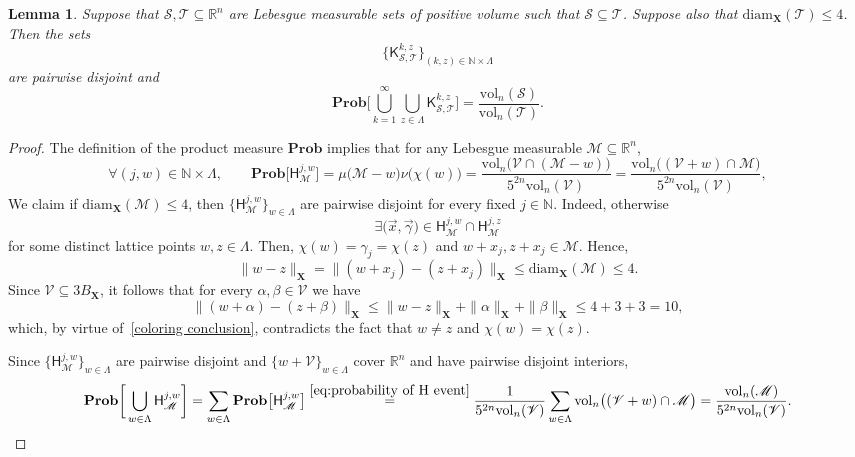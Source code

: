 \documentclass[11pt,reqno]{amsart}
\renewcommand{\le}{\leqslant}
\newcommand{\diam}{\mathrm{diam}}
\newcommand{\X}{\mathbf X}
\newcommand{\R}{\mathbb R}
\newtheorem{lemma}[theorem]{Lemma}
\theoremstyle{remark}
\renewcommand{\subset}{\subseteq}
\newcommand{\N}{\mathbb N}
\renewcommand{\Pr}{\mathbf{Prob}}
\newcommand{\vol}{\mathrm{vol}}
\renewcommand{\1}{\mathbf 1}
\newcommand{\DD}{\mathscr{V}}
\begin{document}
\begin{lemma}\label{lem:volume ratio}
Suppose that $\mathscr{S},\mathscr{T}\subset \R^n$ are Lebesgue measurable sets of positive volume such that $\mathscr{S}\subset   \mathscr{T}$. Suppose also that $\diam_{\X}(\mathscr{T})\le 4$. Then the sets $$\big\{\mathsf{K}_{\mathscr{S,T}}^{k,z}\big\}_{(k,z)\in \N\times \Lambda}$$ are pairwise disjoint and
\begin{equation}\label{eq:hitting set prob}
\Pr\bigg[\bigcup_{k=1}^\infty\bigcup_{z\in \Lambda}\mathsf{K}_{\mathscr{S,T}}^{k,z}\bigg]=\frac{\vol_n(\mathscr{S})}{\vol_n(\mathscr{T})}.
\end{equation}
\end{lemma}


\begin{proof} The definition of the product measure $\Pr$ implies that for any Lebesgue measurable $\mathscr{M}\subset \R^n$,
\begin{equation}\label{eq:probability of H event}
\forall (j,w)\in \N\times \Lambda,\qquad \Pr\big[\mathsf{H}_{\mathscr{M}}^{j,w}\big]=\mu\big(\mathscr{M}-w\big)\nu\big(\chi(w)\big)=\frac{\vol_n\big(\DD\cap(\mathscr{M}-w)\big)}{5^{2n}\vol_n(\DD)}=\frac{\vol_n\big((\DD+w)\cap\mathscr{M}\big)}{5^{2n}\vol_n(\DD)},
\end{equation}
We claim if  $\diam_{\X}(\mathscr{M})\le 4$, then $\{\mathsf{H}_{\mathscr{M}}^{j,w}\}_{w\in \Lambda}$ are pairwise disjoint for every fixed $j\in \N$. Indeed, otherwise
$$
\exists \big(\vec{x},\vec{\gamma}\big)\in \mathsf{H}_{\mathscr{M}}^{j,w}\cap \mathsf{H}_{\mathscr{M}}^{j,z}
$$
for some distinct lattice points  $w,z\in \Lambda$. Then, $\chi(w)=\gamma_j=\chi(z)$ and $w+x_j,z+x_j\in \mathscr{M}$. Hence, $$\|w-z\|_{\X}=\|(w+x_j)-(z+x_j)\|_{\X}\le \diam_{\X}(\mathscr{M})\le 4.$$ Since $\DD\subset 3B_{\X}$, it follows that for every $\alpha,\beta\in \DD$ we have $$\|(w+\alpha)-(z+\beta)\|_{\X}\le \|w-z\|_{\X}+\|\alpha\|_{\X}+\|\beta\|_{\X}\le 4+3+3= 10,$$
which, by virtue of~\eqref{coloring conclusion}, contradicts the fact that $w\neq z$ and  $\chi(w)=\chi(z)$.

Since $\{\mathsf{H}_{\mathscr{M}}^{j,w}\}_{w\in \Lambda}$ are pairwise disjoint and $\{w+\DD\}_{w\in \Lambda}$ cover $\R^n$ and have pairwise disjoint interiors,
\begin{equation}\label{eq:sum of probs H events}
\Pr\bigg[\bigcup_{w\in \Lambda}\mathsf{H}_{\mathscr{M}}^{j,w} \bigg]=\sum_{w\in \Lambda}\Pr\big[\mathsf{H}_{\mathscr{M}}^{j,w}\big]\stackrel{\eqref{eq:probability of H event} }{=}\frac{1}{{5^{2n}\vol_n(\DD)}}\sum_{w\in \Lambda}\vol_n\big((\DD+w)\cap\mathscr{M}\big)=\frac{\vol_n(\mathscr{M})}{{5^{2n}\vol_n(\DD)}}.
\end{equation}


\end{proof}
\end{document}
